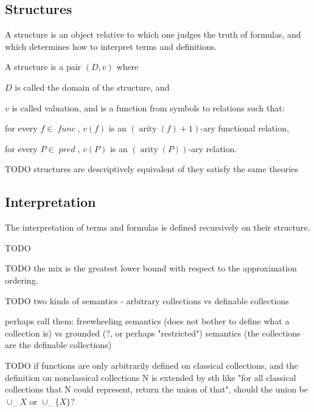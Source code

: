 \documentclass[oneside,12pt]{book}
\theoremstyle{definition}
\theoremstyle{remark}
\newcommand\var[1]{\mathop{\mathit{#1}}\nolimits}
\DeclareMathOperator{\arity}{arity}
\newcommand{\func}{\var{func}}
\newcommand{\pred}{\var{pred}} %
\begin{document}
\subsection{Structures}
A structure is an object relative to which one judges the truth of formulas,
and which determines how to interpret terms and definitions.

\begin{defBox}
  A structure is a pair $(D, v)$ where
  \begin{compactenum}
    \item $D$ is called the domain of the structure, and
    \item $v$ is called valuation, and is a function from symbols to relations such that:
      \begin{compactenum}
        \item for every $f \in \func$, $v(f)$ is an $(\arity(f) + 1)$-ary
          functional relation,
        \item for every $P \in \pred$, $v(P)$ is an $(\arity(P))$-ary relation.
      \end{compactenum}
  \end{compactenum}
\end{defBox}

TODO structures are descriptively equivalent of they satisfy the same theories

\subsection{Interpretation}
The interpretation of terms and formulas is defined recursively on their structure.

\begin{defBox}
  TODO
\end{defBox}

TODO the mix is the greatest lower bound with respect to the approximation ordering.

TODO two kinds of semantics - arbitrary collections vs definable collections

perhaps call them:
freewheeling semantics (does not bother to define what a collection is) vs
grounded (?, or perhaps "restricted") semantics (the collections are the definable
collections)

TODO if functions are only arbitrarily defined on classical collections, and the
definition on nonclassical collections N is extended by sth like "for all
classical collections that N could represent, return the union of that",
should the union be $\cup_{...} X$ or $\cup_{...} \{ X \}$?
\end{document}
